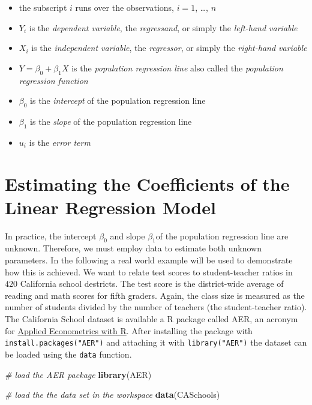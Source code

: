 \documentclass[]{book}
\newenvironment{Shaded}{\begin{snugshade}}{\end{snugshade}}
\newcommand{\KeywordTok}[1]{\textcolor[rgb]{0.13,0.29,0.53}{\textbf{#1}}}
\newcommand{\CommentTok}[1]{\textcolor[rgb]{0.56,0.35,0.01}{\textit{#1}}}
\newcommand{\NormalTok}[1]{#1}
\providecommand{\tightlist}{%
  \setlength{\itemsep}{0pt}\setlength{\parskip}{0pt}}
\theoremstyle{definition}
\theoremstyle{definition}
\theoremstyle{definition}
\theoremstyle{remark}
\begin{document}
\begin{itemize}
\tightlist
\item
  the subscript \(i\) runs over the observations, \(i = 1\), \ldots{},
  \(n\)
\item
  \(Y_i\) is the \emph{dependent variable}, the \emph{regressand}, or
  simply the \emph{left-hand variable}
\item
  \(X_i\) is the \emph{independent variable}, the \emph{regressor}, or
  simply the \emph{right-hand variable}
\item
  \(Y = \beta_0 + \beta_1 X\) is the \emph{population regression line}
  also called the \emph{population regression function}
\item
  \(\beta_0\) is the \emph{intercept} of the population regression line
\item
  \(\beta_1\) is the \emph{slope} of the population regression line
\item
  \(u_i\) is the \emph{error term}
\end{itemize}

\section{Estimating the Coefficients of the Linear Regression
Model}\label{estimating-the-coefficients-of-the-linear-regression-model}

In practice, the intercept \(\beta_0\) and slope \(\beta_1\)of the
population regression line are unknown. Therefore, we must employ data
to estimate both unknown parameters. In the following a real world
example will be used to demonstrate how this is achieved. We want to
relate test scores to student-teacher ratios in \(420\) California
school destricts. The test score is the district-wide average of reading
and math scores for fifth graders. Again, the class size is measured as
the number of students divided by the number of teachers (the
student-teacher ratio). The California School dataset is available a R
package called AER, an acronym for
\href{https://cran.r-project.org/web/packages/AER/AER.pdf}{Applied
Econometrics with R}. After installing the package with
\texttt{install.packages("AER")} and attaching it with
\texttt{library("AER")} the dataset can be loaded using the
\texttt{data} function.

\begin{Shaded}
\begin{Highlighting}[]
\CommentTok{# load the AER package }
\KeywordTok{library}\NormalTok{(AER)   }

\CommentTok{# load the the data set in the workspace}
\KeywordTok{data}\NormalTok{(CASchools) }
\end{Highlighting}
\end{Shaded}
\end{document}
